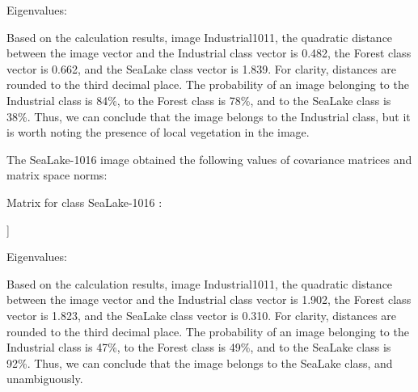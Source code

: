 \documentclass{article}
\begin{document}
\begin{multicols*}{2}
\noindent Eigenvalues: 
\par [5.47 1.862 0.487 0.089 0.042 0.032 0.006 0.014] 
\vspace{10pt}

\noindent Based on the calculation results, image Industrial1011, the quadratic distance between the image vector
and the Industrial class vector is 0.482, the Forest class
vector is 0.662, and the SeaLake class vector is 1.839.
For clarity, distances are rounded to the third decimal
place. The probability of an image belonging to the
Industrial class is 84\%, to the Forest class is 78\%, and
to the SeaLake class is 38\%. Thus, we can conclude that
the image belongs to the Industrial class, but it is worth
noting the presence of local vegetation in the image. 

\par The SeaLake-1016 image obtained the following
values of covariance matrices and matrix space norms: 
\vspace{10pt}

\noindent Matrix for class SeaLake-1016 : 
\par [[1. 0.465 0.383 0.433 0.409 0.306 0.316 0.124]
\par [0.465 1. 0.56 0.621 0.605 0.459 0.477 0.137] 
\par [0.383 0.56 1. 0.546 0.512 0.439 0.386 0.172] 
\par [0.433 0.621 0.546 1. 0.647 0.51 0.481 0.202] 
\par [0.409 0.605 0.512 0.647 1. 0.553 0.562 0.238]
\par [0.306 0.459 0.439 0.51 0.553 1. 0.42 0.174] 
\par [0.316 0.477 0.386 0.481 0.562 0.42 1. 0.095] 
\par [0.124 0.137 0.172 0.202 0.238 0.174 0.095 1. ]] 
\vspace{10pt}

\noindent Eigenvalues: 
\par [3.981 0.955 0.746 0.611 0.553 0.453 0.371 0.331] 
\vspace{10pt}

\noindent Based on the calculation results, image Industrial1011, the quadratic distance between the image vector
and the Industrial class vector is 1.902, the Forest
class vector is 1.823, and the SeaLake class vector is
0.310. For clarity, distances are rounded to the third
decimal place. The probability of an image belonging
to the Industrial class is 47\%, to the Forest class is
49\%, and to the SeaLake class is 92\%. Thus, we can
conclude that the image belongs to the SeaLake class,
and unambiguously. 


\end{multicols*}
\end{document}
